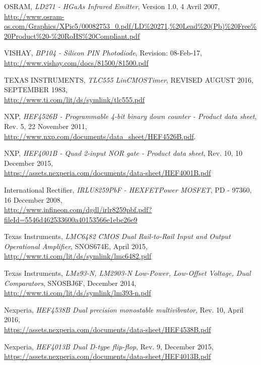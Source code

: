\documentclass[french]{layout/Report}
\begin{document}
\begin{thebibliography}{9}

	OSRAM,
	\textit{LD271 - HGaAs Infrared Emitter},
	Version 1.0,
	4 Avril 2007,
	\url{http://www.osram-os.com/Graphics/XPic5/00082753_0.pdf/LD%20271,%20Lead%20(Pb)%20Free%20Product%20-%20RoHS%20Compliant.pdf}

		VISHAY,
		\textit{BP104 - Silicon PIN Photodiode},
		Revision: 08-Feb-17,\\
		\url{http://www.vishay.com/docs/81500/81500.pdf}

		TEXAS INSTRUMENTS,
		\textit{TLC555 LinCMOS\texttrademark Timer},
		REVISED AUGUST 2016,
		SEPTEMBER 1983,\\
		\url{http://www.ti.com/lit/ds/symlink/tlc555.pdf}

		NXP,
		\textit{HEF4526B - Programmable 4-bit binary down counter - Product data sheet},
		Rev. 5,
		22 November 2011,\\
		\url{http://www.nxp.com/documents/data_sheet/HEF4526B.pdf}.

        NXP,
        \textit{HEF4001B - Quad 2-input NOR gate - Product data sheet},
        Rev. 10,
        10 December 2015,\\
        \url{https://assets.nexperia.com/documents/data-sheet/HEF4001B.pdf}

        International Rectifier,
        \textit{IRLU8259PbF - HEXFET\textregistered Power MOSFET},
        PD - 97360,
        16 December 2008,\\
        \url{http://www.infineon.com/dgdl/irlr8259pbf.pdf?fileId=5546d462533600a40153566e1ebe26e9}

        Texas Instruments,
        \textit{LMC6482 CMOS Dual Rail-to-Rail Input and Output Operational Amplifier},
        SNOS674E,
        April 2015,\\
        \url{http://www.ti.com/lit/ds/symlink/lmc6482.pdf}

		Texas Instruments,
		\textit{LMx93-N, LM2903-N Low-Power, Low-Offset Voltage, Dual Comparators},
		SNOSBJ6F,
		December 2014,\\
		\url{http://www.ti.com/lit/ds/symlink/lm393-n.pdf}

        Nexperia,
        \textit{HEF4538B Dual precision monostable multivibrator},
        Rev. 10,
        April 2016,\\
        \url{https://assets.nexperia.com/documents/data-sheet/HEF4538B.pdf}

        Nexperia,
        \textit{HEF4013B Dual D-type flip-flop},
        Rev. 9,
        December 2015,\\
        \url{https://assets.nexperia.com/documents/data-sheet/HEF4013B.pdf}
\end{thebibliography}


\end{document}

